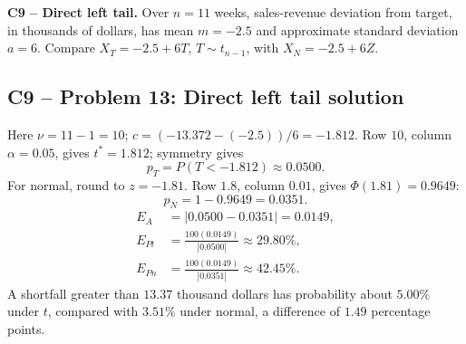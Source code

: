 {
\textbf{C9 -- Direct left tail.} Over $n=11$ weeks, sales-revenue deviation from target, in thousands of dollars, has mean $m=-2.5$ and approximate standard deviation $a=6$. Compare $X_T=-2.5+6T$, $T\sim t_{n-1}$, with $X_N=-2.5+6Z$.
\label{sol:q13}
\subsection*{C9 -- Problem 13: Direct left tail solution }
Here $\nu=11-1=10$; $c=(-13.372-(-2.5))/6=-1.812$.
Row $10$, column $\alpha=0.05$, gives $t^*=1.812$; symmetry gives
\[
 p_T=P(T<-1.812)\approx\boxed{0.0500}.
\]
For normal, round to $z=-1.81$. Row $1.8$, column $0.01$, gives $\Phi(1.81)=0.9649$:
\[
 p_N=1-0.9649=\boxed{0.0351}.
\]
\[
 \begin{aligned}
 E_A&=|0.0500-0.0351|=\boxed{0.0149},\\
 E_{Pt}&=\frac{100(0.0149)}{|0.0500|}\approx\boxed{29.80\%},\\
 E_{Pn}&=\frac{100(0.0149)}{|0.0351|}\approx\boxed{42.45\%}.
 \end{aligned}
\]
A shortfall greater than $13.37$ thousand dollars has probability about $5.00\%$ under $t$, compared with $3.51\%$ under normal, a difference of $1.49$ percentage points.
\secInicio[sec:q13]
}

